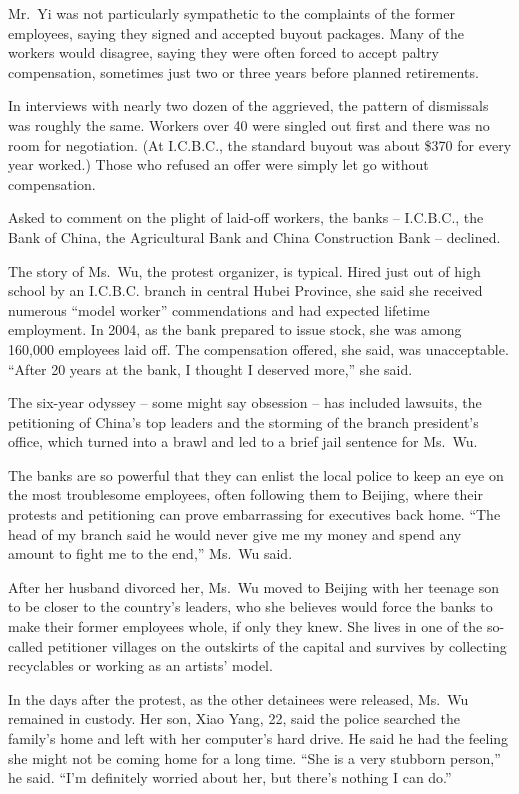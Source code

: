 ﻿\documentclass[12pt]{article}
\begin{document}
Mr.~Yi was not particularly sympathetic to the complaints of the former employees, saying they
signed and accepted buyout packages. Many of the workers would disagree, saying they were often
forced to accept paltry compensation, sometimes just two or three years before planned retirements.

In interviews with nearly two dozen of the aggrieved, the pattern of dismissals was roughly the
same. Workers over 40 were singled out first and there was no room for negotiation. (At I.C.B.C.,
the standard buyout was about \$370 for every year worked.) Those who refused an offer were simply
let go without compensation.

Asked to comment on the plight of laid-off workers, the banks -- I.C.B.C., the Bank of China, the
Agricultural Bank and China Construction Bank -- declined.

The story of Ms.~Wu, the protest organizer, is typical. Hired just out of high school by an I.C.B.C.
branch in central Hubei Province, she said she received numerous ``model worker'' commendations and
had expected lifetime employment. In 2004, as the bank prepared to issue stock, she was among
160,000 employees laid off. The compensation offered, she said, was unacceptable. ``After 20 years
at the bank, I thought I deserved more,'' she said.

The six-year odyssey -- some might say obsession -- has included lawsuits, the petitioning of
China's top leaders and the storming of the branch president's office, which turned into a brawl and
led to a brief jail sentence for Ms.~Wu.

The banks are so powerful that they can enlist the local police to keep an eye on the most
troublesome employees, often following them to Beijing, where their protests and petitioning can
prove embarrassing for executives back home. ``The head of my branch said he would never give me my
money and spend any amount to fight me to the end,'' Ms.~Wu said.

After her husband divorced her, Ms.~Wu moved to Beijing with her teenage son to be closer to the
country's leaders, who she believes would force the banks to make their former employees whole, if
only they knew. She lives in one of the so-called petitioner villages on the outskirts of the
capital and survives by collecting recyclables or working as an artists' model.

In the days after the protest, as the other detainees were released, Ms.~Wu remained in custody. Her
son, Xiao Yang, 22, said the police searched the family's home and left with her computer's hard
drive. He said he had the feeling she might not be coming home for a long time. ``She is a very
stubborn person,'' he said. ``I'm definitely worried about her, but there's nothing I can do.''
\end{document}
